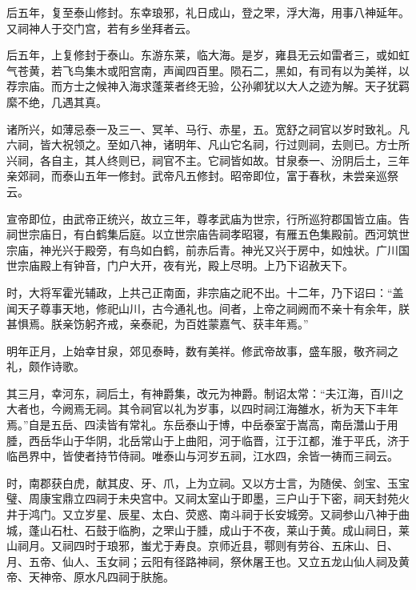 \documentclass[12pt,UTF8]{ctexbook}
\begin{document}
后五年，复至泰山修封。东幸琅邪，礼日成山，登之罘，浮大海，用事八神延年。又祠神人于交门宫，若有乡坐拜者云。



后五年，上复修封于泰山。东游东莱，临大海。是岁，雍县无云如雷者三，或如虹气苍黄，若飞鸟集木或阳宫南，声闻四百里。陨石二，黑如，有司有以为美祥，以荐宗庙。而方士之候神入海求蓬莱者终无验，公孙卿犹以大人之迹为解。天子犹羁縻不绝，几遇其真。



诸所兴，如薄忌泰一及三一、冥羊、马行、赤星，五。宽舒之祠官以岁时致礼。凡六祠，皆大祝领之。至如八神，诸明年、凡山它名祠，行过则祠，去则已。方士所兴祠，各自主，其人终则已，祠官不主。它祠皆如故。甘泉泰一、汾阴后土，三年亲郊祠，而泰山五年一修封。武帝凡五修封。昭帝即位，富于春秋，未尝亲巡祭云。



宣帝即位，由武帝正统兴，故立三年，尊孝武庙为世宗，行所巡狩郡国皆立庙。告祠世宗庙日，有白鹤集后庭。以立世宗庙告祠孝昭寝，有雁五色集殿前。西河筑世宗庙，神光兴于殿旁，有鸟如白鹤，前赤后青。神光又兴于房中，如烛状。广川国世宗庙殿上有钟音，门户大开，夜有光，殿上尽明。上乃下诏赦天下。



时，大将军霍光辅政，上共己正南面，非宗庙之祀不出。十二年，乃下诏曰：“盖闻天子尊事天地，修祀山川，古今通礼也。间者，上帝之祠阙而不亲十有余年，朕甚惧焉。朕亲饬躬齐戒，亲泰祀，为百姓蒙嘉气、获丰年焉。”



明年正月，上始幸甘泉，郊见泰畤，数有美祥。修武帝故事，盛车服，敬齐祠之礼，颇作诗歌。



其三月，幸河东，祠后土，有神爵集，改元为神爵。制诏太常：“夫江海，百川之大者也，今阙焉无祠。其令祠官以礼为岁事，以四时祠江海雒水，祈为天下丰年焉。”自是五岳、四渎皆有常礼。东岳泰山于博，中岳泰室于嵩高，南岳灊山于用腄，西岳华山于华阴，北岳常山于上曲阳，河于临晋，江于江都，淮于平氏，济于临邑界中，皆使者持节侍祠。唯泰山与河岁五祠，江水四，余皆一祷而三祠云。



时，南郡获白虎，献其皮、牙、爪，上为立祠。又以方士言，为随侯、剑宝、玉宝璧、周康宝鼎立四祠于未央宫中。又祠太室山于即墨，三户山于下密，祠天封苑火井于鸿门。又立岁星、辰星、太白、荧惑、南斗祠于长安城旁。又祠参山八神于曲城，蓬山石杜、石鼓于临朐，之罘山于腄，成山于不夜，莱山于黄。成山祠日，莱山祠月。又祠四时于琅邪，蚩尤于寿良。京师近县，鄠则有劳谷、五床山、日、月、五帝、仙人、玉女祠；云阳有径路神祠，祭休屠王也。又立五龙山仙人祠及黄帝、天神帝、原水凡四祠于肤施。
\end{document}
